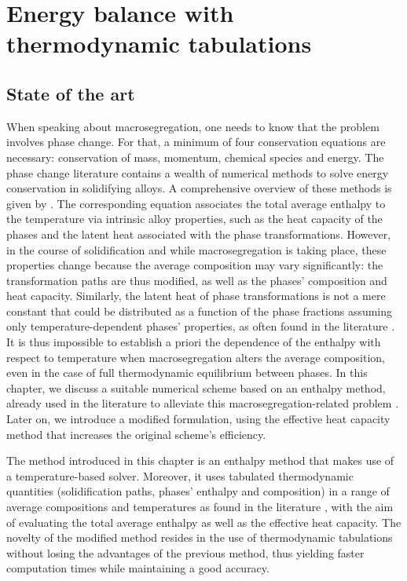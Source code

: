 \chapter{Energy balance with thermodynamic tabulations}
\begin{nolinkcolors} 
\minitoc
\end{nolinkcolors}
\newpage
%
%
\section{State of the art}
When speaking about macrosegregation, one needs to know that the problem involves phase change.
For that, a minimum of four conservation equations are necessary:
conservation  of  mass, momentum,  chemical  species and  energy. The  phase  change
literature  contains a  wealth of numerical methods to solve energy conservation
in solidifying alloys. A comprehensive overview of these methods is given by \citet{swaminathan._enthalpy_1993}.
The corresponding equation associates the total average enthalpy to the
temperature  via  intrinsic  alloy  properties, such  as the heat  capacity of  the
phases and the latent  heat associated with the phase transformations. However, in the course
of solidification and while macrosegregation is taking place, these  properties change because the average
composition may  vary  significantly: the  transformation paths are thus modified, as well as
the phases' composition and heat capacity. Similarly, the latent heat of phase  transformations
is not a mere constant that could be distributed as a function of the phase fractions
assuming only temperature-dependent phases' properties, as often found in the literature \citep{bellet_call_2009}.
It is thus impossible to establish a priori the dependence of the enthalpy with respect
to temperature when macrosegregation alters the average composition, even in the case of full thermodynamic equilibrium
between phases. In this chapter, we discuss a suitable numerical scheme based on an enthalpy method,
already used in the literature  to  alleviate this macrosegregation-related problem \citep{swaminathan._enthalpy_1993,
carozzani_direct_2013}. Later on, we introduce a modified formulation, using the effective heat capacity method that 
increases the original scheme's efficiency. 

The method introduced in this chapter is an enthalpy method that makes use of a temperature-based solver. 
Moreover, it uses tabulated thermodynamic quantities (solidification paths, phases' enthalpy  and composition) 
in a range of average compositions and temperatures as found in the literature 
\citep{dore_modelling_2000,thuinet_prediction_2004,du_modeling_2007}, 
with the aim of evaluating the total average enthalpy as well as the effective heat capacity. 
The novelty of the modified method resides in the use of thermodynamic tabulations without losing 
the advantages of the previous method, thus yielding faster computation times while maintaining a 
good accuracy.
%
%
